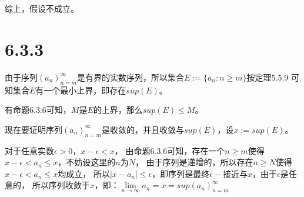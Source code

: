 \documentclass{article}
\theoremstyle{mystyle}
\begin{document}
综上，假设不成立。

\section*{6.3.3}

由于序列$(a_n)_{n=m}^\infty$是有界的实数序列，所以集合$E := \{a_n : n \geq m\}$按定理5.5.9
可知集合$E$有一个最小上界，即存在$sup(E)$。

有命题6.3.6可知，$M$是$E$的上界，那么$sup(E) \leq M$。

现在要证明序列$(a_n)_{n=m}^\infty$是收敛的，并且收敛与$sup(E)$，设$x:=sup(E)$。

对于任意实数$\epsilon > 0$，$x - \epsilon < x$，
由命题6.3.6可知，存在一个$n \geq m$使得$x-\epsilon < a_n \leq x$，不妨设这里的$n$为$N$， 
由于序列是递增的，所以存在$n \geq N$使得$x-\epsilon < a_n \leq x$均成立，
所以$|x - a_n| \leq \epsilon$，即序列是最终$\epsilon -$接近与$x$，由于$\epsilon$是任意的，
所以序列收敛于$x$，即：$\lim\limits_{n \to \infty} a_n = x = sup(a_n)_{n=m}^\infty$
\end{document}
